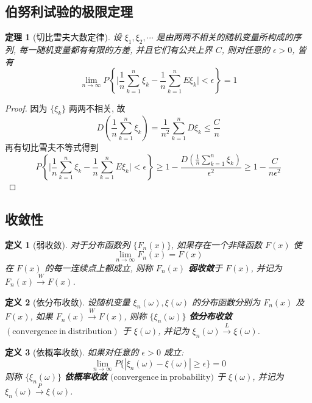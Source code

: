\documentclass[12pt,a4paper]{article}
\newtheorem{thm}{定理}[subsection]  %
\newtheorem{definition}{定义}[subsection] %
\begin{document}
\subsection{伯努利试验的极限定理}
\begin{thm}[切比雪夫大数定律]
    设 $\xi_1, \xi_2, \cdots$ 是由两两不相关的随机变量所构成的序列, 每一随机变量都有有限的方差, 并且它们有公共上界 $C$, 则对任意的 $\epsilon > 0$, 皆有
    \[\lim_{n \to \infty} P\left\{ \Big| \frac{1}{n} \sum\limits_{k=1}^n \xi_k - \frac{1}{n} \sum\limits_{k=1}^n E\xi_k \Big| < \epsilon \right\} = 1 \]
\end{thm}
\begin{proof}
    因为 $\{\xi_k\}$ 两两不相关, 故 \[D\left( \frac{1}{n} \sum\limits_{k=1}^n \xi_k \right) = \frac{1}{n^2} \sum\limits_{k=1}^n D\xi_k \leq \frac{C}{n}\]
    再有切比雪夫不等式得到 \[P\left\{ \Big| \frac{1}{n} \sum\limits_{k=1}^n \xi_k - \frac{1}{n} \sum\limits_{k=1}^n E\xi_k \Big| < \epsilon \right\} \geq 1 - \frac{D(\frac{1}{n}\sum\limits_{k=1}^n \xi_k)}{\epsilon^2} \geq 1 - \frac{C}{n\epsilon^2}\]
\end{proof}

\subsection{收敛性}

\begin{definition}[弱收敛]
    对于分布函数列 $\{ F_n(x)\}$, 如果存在一个非降函数 $F(x)$ 使
    \[ \lim\limits_{n \to \infty} F_n(x) = F(x)\]
    在 $F(x)$ 的每一连续点上都成立, 则称 $F_n(x)$ \textbf{弱收敛}于 $F(x)$, 并记为 $F_n(x) \overset{W}{\to} F(x)$.
\end{definition}

\begin{definition}[依分布收敛]
    设随机变量 $\xi_n(\omega),\xi(\omega)$ 的分布函数分别为 $F_n(x)$ 及 $F(x)$, 如果 $F_n(x) \overset{W}{\to} F(x)$, 则称 $\{\xi_n(\omega)\}$ 
    \textbf{依分布收敛} $(\mathrm{convergence \ in \ distribution})$ 于 $\xi(\omega)$, 并记为 $\xi_n(\omega) \overset{L}{\to} \xi(\omega)$.
\end{definition}

\begin{definition}[依概率收敛]
    如果对任意的 $\epsilon > 0$ 成立:
    \[\lim\limits_{n \to \infty} P\{ |\xi_n(\omega) - \xi(\omega)| \geq \epsilon \} = 0\]
    则称 $\{\xi_n(\omega)\}$ \textbf{依概率收敛} $(\mathrm{convergence \ in \ probability)}$ 于 $\xi(\omega)$, 并记为 $\xi_n(\omega) \overset{P}{\to} \xi(\omega)$.
\end{definition}
\end{document}
